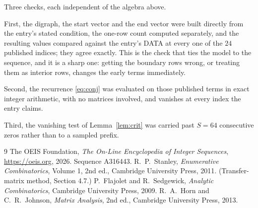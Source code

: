 \documentclass[11pt,a4paper]{article}
\theoremstyle{plain}
\theoremstyle{definition}
\begin{document}
Three checks, each independent of the algebra above.

First, the digraph, the start vector and the end vector were built directly from the
entry's stated condition, the one-row count computed separately, and the resulting values
compared against the entry's DATA at every one of the $24$ published indices; they
agree exactly. This is the check that ties the model to the sequence, and it is a sharp one:
getting the boundary rows wrong, or treating them as interior rows, changes the early terms
immediately.

Second, the recurrence \eqref{eq:conj} was evaluated on those published terms in exact
integer arithmetic, with no matrices involved, and vanishes at every index the entry claims.

Third, the vanishing test of Lemma~\ref{lem:crit} was carried past $S=64$ consecutive
zeros rather than to a sampled prefix.

\begin{thebibliography}{9}
 The OEIS Foundation, \emph{The On-Line Encyclopedia of Integer
Sequences}, \url{https://oeis.org}, 2026. Sequence A316443.
 R.~P.~Stanley, \emph{Enumerative Combinatorics}, Volume 1, 2nd ed.,
Cambridge University Press, 2011. (Transfer-matrix method, Section 4.7.)
 P.~Flajolet and R.~Sedgewick, \emph{Analytic Combinatorics}, Cambridge
University Press, 2009.
 R.~A.~Horn and C.~R.~Johnson, \emph{Matrix Analysis}, 2nd ed., Cambridge
University Press, 2013.
\end{thebibliography}
\end{document}
